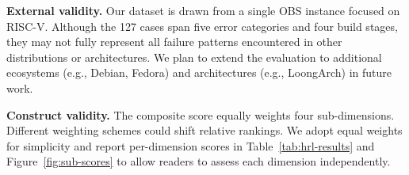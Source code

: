 \documentclass[sigconf]{acmart}
\begin{document}
\textbf{External validity.} Our dataset is drawn from a single OBS instance focused on RISC-V. Although the 127 cases span five error categories and four build stages, they may not fully represent all failure patterns encountered in other distributions or architectures. We plan to extend the evaluation to additional ecosystems (e.g., Debian, Fedora) and architectures (e.g., LoongArch) in future work.

\textbf{Construct validity.} The composite score equally weights four sub-dimensions. Different weighting schemes could shift relative rankings. We adopt equal weights for simplicity and report per-dimension scores in Table~\ref{tab:hrl-results} and Figure~\ref{fig:sub-scores} to allow readers to assess each dimension independently.




\end{document}

